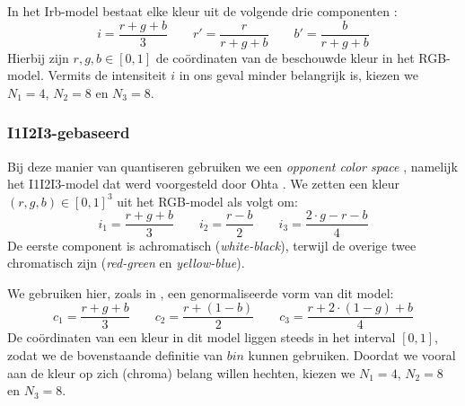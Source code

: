In het Irb-model bestaat elke kleur uit de volgende drie componenten \cite{ohta:color_info_for_region_segm}:
$$
i = \frac{r+g+b}{3} \qquad
r' = \frac{r}{r+g+b} \qquad
b' = \frac{b}{r+g+b}
$$
Hierbij zijn $r,g,b \in [0,1]$ de co\"ordinaten van de beschouwde kleur in het RGB-model.
Vermits de intensiteit $i$ in ons geval minder belangrijk is, kiezen we $N_1=4$, $N_2=8$ en $N_3=8$.

%

\subsubsection{I1I2I3-gebaseerd}

Bij deze manier van quantiseren gebruiken we een
\emph{opponent color space} \cite{tkalcic:colour_spaces, sharma:digital_color_imaging}, namelijk het I1I2I3-model dat werd voorgesteld door 
Ohta \cite{ohta:color_info_for_region_segm}. We zetten een kleur $(r,g,b) \in [0,1]^3$ uit het RGB-model als volgt om:
$$
i_1 = \frac{r+g+b}{3} \qquad
i_2 = \frac{r-b}{2} \qquad
i_3 = \frac{2 \cdot g - r - b}{4}
$$
De eerste component is achromatisch (\emph{white-black}), terwijl de overige twee 
chromatisch zijn (\emph{red-green} en \emph{yellow-blue}).

We gebruiken hier, zoals in \cite{wang:cbir_using_daubechies_wavelets}, een genormaliseerde vorm van dit model:
$$
c_1 = \frac{r+g+b}{3} \qquad
c_2 = \frac{r + (1 - b)}{2} \qquad
c_3 = \frac{r + 2 \cdot (1 - g) + b}{4}
$$
De co\"ordinaten van een kleur in dit model liggen steeds in het interval $[0,1]$,
zodat we de bovenstaande definitie van $bin$ kunnen gebruiken. 
Doordat we vooral aan de kleur op zich (chroma) belang willen hechten, kiezen we 
$N_1=4$, $N_2=8$ en $N_3=8$.

